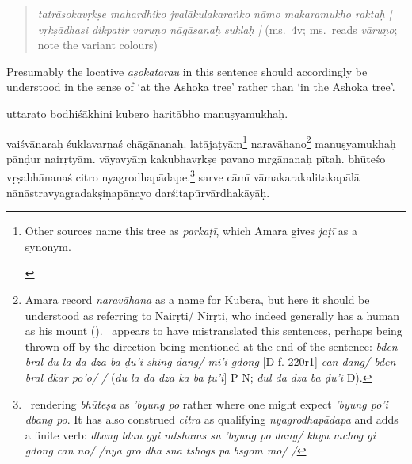 \documentclass[naipra.tex]{subfiles}
\begin{document}
\begin{sanskrit}
{	\begin{quote}
		\emph{tatrāsokavṛkṣe mahardhiko jvalākulakaraṅko nāmo makaramukho raktaḥ | vṛkṣādhasi dikpatir varuṇo nāgāsanaḥ suklaḥ |} (ms.\ 4v; ms.\ reads \emph{vāruṇo}; note the variant colours)
	\end{quote}

	\noindent Presumably the locative \emph{aṣokatarau} in this sentence should accordingly be understood in the sense of `at the Ashoka tree' rather than `in the Ashoka tree'.
}
uttarato bodhiśākhini kubero haritābho manuṣyamukhaḥ.  
\pend

\pstart
{}  vaiśvānaraḥ śuklavarṇaś chāgānanaḥ.
latājaṭyāṃ\footnote{
	\begin{english}%
		Other sources name this tree as \emph{parkaṭī}, which Amara gives \emph{jaṭī} as a synonym.
	\end{english}
} naravāhano\footnote{
	Amara record \emph{naravāhana} as a name for Kubera, but here it should be understood as referring to Nairṛti/ Nirṛti, who indeed generally has a human as his mount (\cite[98 ff.]{wesselsmevissen2001}). \TIB\ appears to have mistranslated this sentences, perhaps being thrown off by the direction being mentioned at the end of the sentence: \emph{bden bral du la da dza ba ḍu'i shing dang/ mi'i gdong} [D f. 220r1] \emph{can dang/ bden bral dkar po'o/ /} (\emph{du la da dza ka ba ṭu'i}] P N; \emph{dul da dza ba ḍu'i} D).
} manuṣyamukhaḥ pāṇḍur nairṛtyām.
vāyavyāṃ kakubhavṛkṣe pavano mṛgānanaḥ pītaḥ.
 bhūteśo vṛṣabhānanaś citro nyagrodhapādape.\footnote{
	\TIB\ rendering \emph{bhūteṣa} as \emph{'byung po} rather where one might expect \emph{'byung po'i dbang po}. It has also construed \emph{citra} as qualifying \emph{nyagrodhapādapa} and adds a finite verb: \emph{dbang ldan gyi mtshams su 'byung po dang/ khyu mchog gi gdong can no/ /nya gro dha sna tshogs pa bsgom mo/ /}
}
sarve cāmī vāmakarakalitakapālā nānāstravyagradakṣiṇapāṇayo darśitapūrvārdhakāyāḥ.
\pend




\end{sanskrit}
\end{document}
